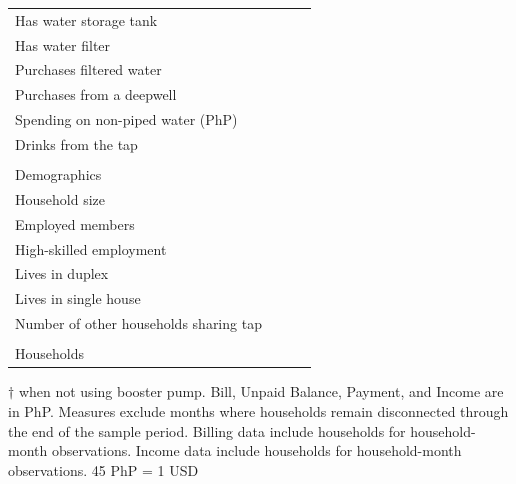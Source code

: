 \documentclass[12pt,table]{article}
\begin{document}
\begin{table}[h!]
\begin{threeparttable}
\begin{tabular}{@{}l*{1}{KKK}@{}}
\hspace{1em}Has water storage tank &  \\
\hspace{1em}Has water filter &  \\
\hspace{1em}Purchases filtered water &  \\
\hspace{1em}Purchases from a deepwell &  \\
\hspace{1em}Spending on non-piped water (PhP) &  \\
\hspace{1em}Drinks from the tap &  \\
\\[-.5em]
Demographics \\[.5em]
\hspace{1em}Household size &  \\
\hspace{1em}Employed members &  \\
\hspace{1em}High-skilled employment &  \\
\hspace{1em}Lives in duplex&  \\
\hspace{1em}Lives in single house&  \\
\hspace{1em}Number of other households sharing tap&  \\
\\[-.5em]
Households &  \\
\bottomrule
\end{tabular}
\begin{tablenotes}
\footnotesize
\item  $\dagger$ when not using booster pump.  Bill, Unpaid Balance, Payment, and Income are in PhP.  Measures exclude months where households remain disconnected through the end of the sample period.  Billing data include households for household-month observations.  Income data include households for household-month observations.  45 PhP = 1 USD \,\,
\end{tablenotes}
\end{threeparttable}
\end{table}
\end{document}
